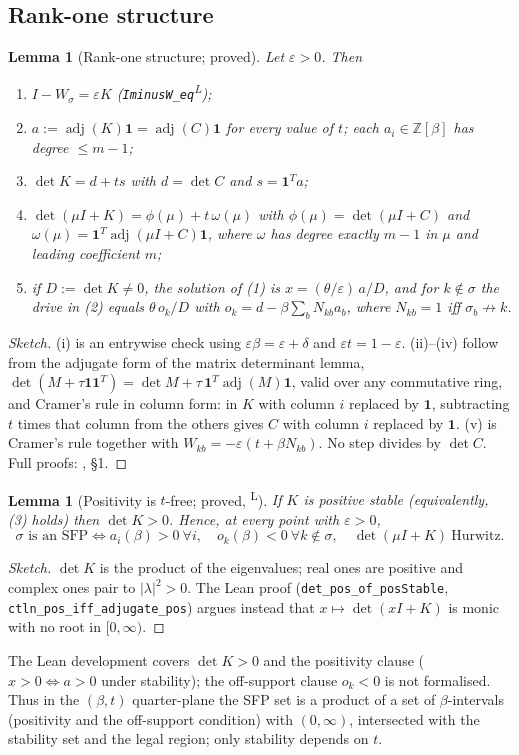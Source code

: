 \documentclass[11pt]{article}
\newtheorem{lemma}[theorem]{Lemma}
\theoremstyle{definition}
\newcommand{\one}{\mathbf{1}}
\newcommand{\eps}{\varepsilon}
\newcommand{\adj}{\operatorname{adj}}
\newcommand{\lean}{\textsuperscript{\textsf{L}}}
\begin{document}
\subsection{Rank-one structure}
\begin{lemma}[Rank-one structure; proved]\label{lem:rankone}
Let $\eps>0$. Then
\begin{enumerate}
\item[(i)] $I-W_\sigma=\eps K$ (\texttt{IminusW\_eq}\lean);
\item[(ii)] $a:=\adj(K)\one=\adj(C)\one$ for every value of $t$; each $a_i\in\mathbb Z[\beta]$ has degree $\le m-1$;
\item[(iii)] $\det K=d+ts$ with $d=\det C$ and $s=\one^Ta$;
\item[(iv)] $\det(\mu I+K)=\phi(\mu)+t\,\omega(\mu)$ with $\phi(\mu)=\det(\mu I+C)$ and
$\omega(\mu)=\one^T\adj(\mu I+C)\one$, where $\omega$ has degree exactly $m-1$ in $\mu$ and leading coefficient $m$;
\item[(v)] if $D:=\det K\ne0$, the solution of (1) is $x=(\theta/\eps)\,a/D$, and for $k\notin\sigma$ the
drive in (2) equals $\theta\, o_k/D$ with $o_k=d-\beta\sum_b N_{kb}a_b$, where $N_{kb}=1$ iff $\sigma_b\not\to k$.
\end{enumerate}
\end{lemma}
\begin{proof}[Sketch]
(i) is an entrywise check using $\eps\beta=\eps+\delta$ and $\eps t=1-\eps$. (ii)--(iv) follow from the
adjugate form of the matrix determinant lemma, $\det(M+\tau\one\one^T)=\det M+\tau\,\one^T\adj(M)\one$,
valid over any commutative ring, and Cramer's rule in column form: in $K$ with column $i$ replaced by
$\one$, subtracting $t$ times that column from the others gives $C$ with column $i$ replaced by $\one$.
(v) is Cramer's rule together with $W_{kb}=-\eps(t+\beta N_{kb})$. No step divides by $\det C$.
Full proofs: , \S1.
\end{proof}

\begin{lemma}[Positivity is $t$-free; proved, \lean]\label{lem:A2}
If $K$ is positive stable (equivalently, (3) holds) then $\det K>0$. Hence, at every point with $\eps>0$,
\[
\sigma\text{ is an SFP}\iff a_i(\beta)>0\ \forall i,\quad o_k(\beta)<0\ \forall k\notin\sigma,\quad
\det(\mu I+K)\ \text{Hurwitz}.
\]
\end{lemma}
\begin{proof}[Sketch]
$\det K$ is the product of the eigenvalues; real ones are positive and complex ones pair to
$|\lambda|^2>0$. The Lean proof (\texttt{det\_pos\_of\_posStable}, \texttt{ctln\_pos\_iff\_adjugate\_pos})
argues instead that $x\mapsto\det(xI+K)$ is monic with no root in $[0,\infty)$.
\end{proof}
The Lean development covers $\det K>0$ and the positivity clause ($x>0\iff a>0$ under stability); the off-support
clause $o_k<0$ is not formalised.
Thus in the $(\beta,t)$ quarter-plane the SFP set is a product of a set of $\beta$-intervals (positivity
and the off-support condition) with $(0,\infty)$, intersected with the stability set and the legal
region; only stability depends on $t$.
\end{document}

